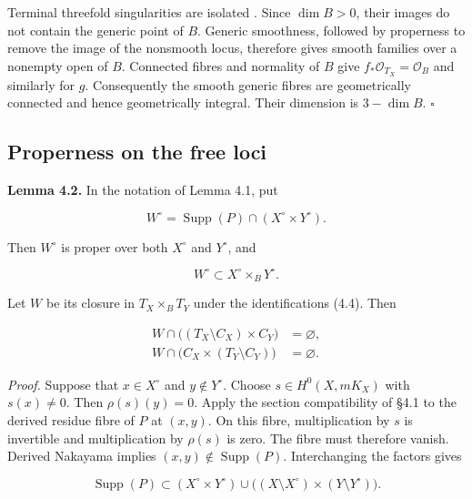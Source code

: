 \documentclass[11pt,a4paper]{article}
\begin{document}
Terminal threefold singularities are isolated \cite[Proposition 2.7]{Kol90}. Since $\dim B>0$, their images do not contain the generic point of $B$. Generic smoothness, followed by properness to remove the image of the nonsmooth locus, therefore gives smooth families over a nonempty open of $B$. Connected fibres and normality of $B$ give $f_*\mathcal O_{T_X}=\mathcal O_B$ and similarly for $g$. Consequently the smooth generic fibres are geometrically connected and hence geometrically integral. Their dimension is $3-\dim B$. $\square$

\subsection{Properness on the free loci}

\noindent \textbf{Lemma 4.2.} In the notation of Lemma 4.1, put

\begin{equation*}
W^\circ=\operatorname{Supp}(P)\cap(X^\circ\times Y^\circ).
\end{equation*}

Then $W^\circ$ is proper over both $X^\circ$ and $Y^\circ$, and

\begin{equation*}
W^\circ\subset X^\circ\times_B Y^\circ.
\tag{4.9}
\end{equation*}

Let $W$ be its closure in $T_X\times_B T_Y$ under the identifications (4.4). Then

\begin{equation*}
\begin{aligned}
W\cap\bigl((T_X\setminus C_X)\times C_Y\bigr)&=\varnothing,\\
W\cap\bigl(C_X\times(T_Y\setminus C_Y)\bigr)&=\varnothing.
\end{aligned}
\tag{4.10}
\end{equation*}

\noindent \emph{Proof.} Suppose that $x\in X^\circ$ and $y\notin Y^\circ$. Choose $s\in H^0(X,mK_X)$ with $s(x)\neq0$. Then $\rho(s)(y)=0$. Apply the section compatibility of \S{}4.1 to the derived residue fibre of $P$ at $(x,y)$. On this fibre, multiplication by $s$ is invertible and multiplication by $\rho(s)$ is zero. The fibre must therefore vanish. Derived Nakayama implies $(x,y)\notin\operatorname{Supp}(P)$. Interchanging the factors gives

\begin{equation*}
\operatorname{Supp}(P)\subset
(X^\circ\times Y^\circ)
\cup
\bigl((X\setminus X^\circ)\times(Y\setminus Y^\circ)\bigr).
\tag{4.11}
\end{equation*}
\end{document}
